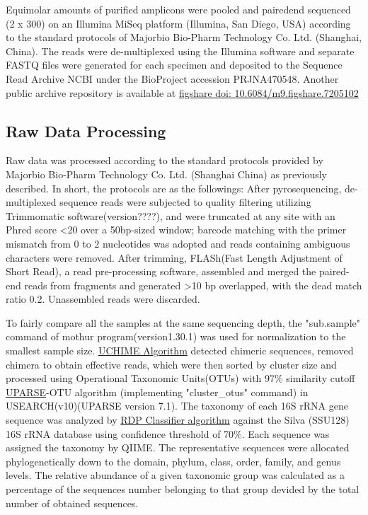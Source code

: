 \documentclass[fleqn,10pt, lineno]{wlpeerj} %
\begin{document}
  \noindent
  Equimolar amounts of purified amplicons were pooled and paired\-end sequenced (2 x 300) on an Illumina MiSeq platform (Illumina, San Diego, USA) according to the standard protocols of Majorbio Bio-Pharm Technology Co. Ltd. (Shanghai, China). The reads were de-multiplexed using the Illumina software and separate FASTQ files were generated for each specimen and deposited to the Sequence Read Archive NCBI under the BioProject accession PRJNA470548. Another public archive repository is available at \href{https://figshare.com/articles/Untitled_Item192_samples_for_publishing_Longitudinal_gut_microbiota_patterns_in_preterm_infants_with_necrotizing_enterocolitis_or_late-onset_sepsis_an_observational_prospective_study_/7205102}{figshare doi: 10.6084/m9.figshare.7205102}

  \subsection*{Raw Data Processing}
  Raw data was processed according to the standard protocols provided by Majorbio Bio-Pharm Technology Co. Ltd. (Shanghai China) as previously described\citep{liu2018splenectomy, wang2018bacterial}. In short, the protocols are as the followings:
  After pyrosequencing, de-multiplexed sequence reads were subjected to quality filtering utilizing Trimmomatic software(version????)\citep{bolger2014trimmomatic},  and were truncated at any site with an Phred score \textless 20 over a 50bp-sized window; barcode matching with the primer mismatch from 0 to 2 nucleotides was adopted and reads containing ambiguous characters were removed. After trimming, FLASh(Fast Length Adjustment of Short Read)\citep{magovc2011flash}, a read pre-processing software, assembled and merged the paired-end reads from fragments and generated \textgreater 10 bp overlapped, with the dead match ratio 0.2. Unassembled reads were discarded.

  \noindent
  To fairly compare all the samples at the same sequencing depth, the "sub.sample" command of mothur program(version1.30.1)\citep{schloss2009introducing} was used for normalization to the smallest sample size. \href{https://www.drive5.com/usearch/manual/uchime_algo.html}{UCHIME Algorithm} detected chimeric sequences, removed chimera to obtain effective reads, which were then sorted by cluster size and processed using Operational Taxonomic Units(OTUs) with 97\% similarity cutoff \href{http://drive5.com/uparse/}{UPARSE}-OTU algorithm (implementing "cluster\_otus" command)\citep{edgar2013uparse} in USEARCH(v10)(UPARSE version 7.1). The taxonomy of each 16S rRNA gene sequence was analyzed by \href{http://rdp.cme.msu.edu/}{RDP Classifier algorithm}\citep{wang2007naive} against the Silva (SSU128)\citep{quast2012silva} 16S rRNA database using confidence threshold of 70\%. Each sequence was assigned the taxonomy by QIIME\citep{caporaso2010qiime}. The representative sequences were allocated phylogenetically down to the domain, phylum, class, order, family, and genus levels. The relative abundance of a given taxonomic group was calculated as a percentage of the sequences number belonging to that group devided by the total number of obtained sequences.
\end{document}
